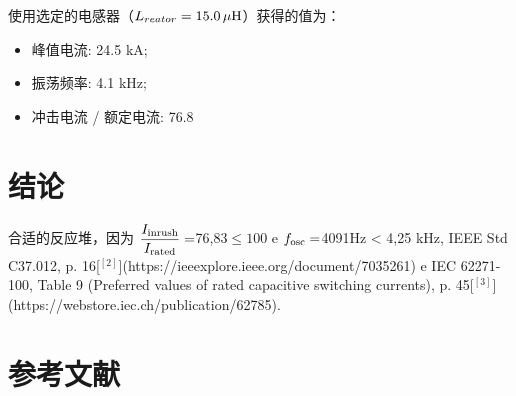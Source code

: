 \documentclass[a4paper]{article}
\begin{document}
	使用选定的电感器（$L_{reator} = {{15.0}} \, \mu \rm{H} $）获得的值为：
	\begin{itemize}[label=\textendash]
		\item 峰值电流: {{24.5 kA}};
		\item 振荡频率: {{4.1 k}}Hz;
		\item 冲击电流 / 额定电流: {{76.8}}
	\end{itemize}
	
	\section{结论}
	{{合适的反应堆，因为 $\dfrac{I_{\rm inrush}}{I_{\rm rated}} = $76,83$\le 100$ e $f_{\rm osc} = $4091Hz < 4,25 kHz, IEEE Std C37.012, p. 16[$^{[2]}$](https://ieeexplore.ieee.org/document/7035261) e IEC 62271-100, Table 9 (Preferred values of rated capacitive switching currents), p. 45[$^{[3]}$](https://webstore.iec.ch/publication/62785).}}
	
	\section{参考文献}
	
\end{document}
